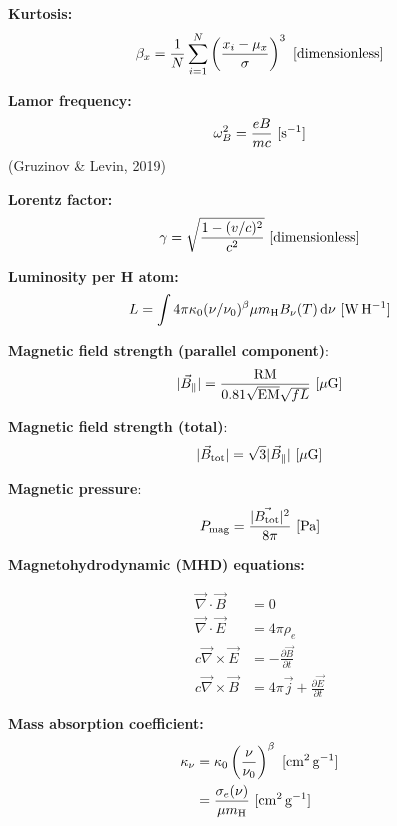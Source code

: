 \documentclass[a4paper,10pt]{article}
\begin{document}
{\noindent}\textbf{Kurtosis:}
\begin{align*}
    \beta_x = \frac{1}{N} \sum_{i=1}^N \left(\frac{x_i-\mu_x}{\sigma}\right)^3 ~ [{\rm dimensionless}]
\end{align*}

{\noindent}\textbf{Lamor frequency:}
\begin{align*}
	\omega_B^2 = \frac{eB}{mc} ~ [{\rm s^{-1}}]
\end{align*}
(Gruzinov \& Levin, 2019)

{\noindent}\textbf{Lorentz factor:}
\begin{align*}
    \gamma = \sqrt{\frac{1 - (v/c)^2}{c^2}} ~ [{\rm dimensionless}]
\end{align*}

{\noindent}\textbf{Luminosity per H atom:}
\begin{align*}
    L = \int 4\pi\kappa_0(\nu/\nu_0)^\beta \mu m_{\rm H}B_\nu(T) \,{\rm d}\nu ~ [{\rm W\,H^{-1}}]
\end{align*}

{\noindent}\textbf{Magnetic field strength (parallel component)}:
\begin{align*}
    \lvert\vec{B}_\parallel\rvert = \frac{\rm RM}{0.81\sqrt{\rm EM}\sqrt{fL}} ~[{\rm \mu G]}
\end{align*}

{\noindent}\textbf{Magnetic field strength (total)}:
\begin{align*}
    \lvert\vec{B}_{\rm tot}\rvert = \sqrt{3}\lvert\vec{B}_\parallel\rvert ~[{\rm \mu G]}
\end{align*}

{\noindent}\textbf{Magnetic pressure}:
\begin{align*}
    P_{\rm mag} = \frac{\lvert\vec{B_{\rm tot}}\rvert^2}{8\pi}~ [{\rm Pa]}
\end{align*}

{\noindent}\textbf{Magnetohydrodynamic (MHD) equations:}

\begin{align*}
    \vec\nabla\cdot\vec{B} &= 0 \\
    \vec\nabla\cdot\vec{E} &= 4\pi\rho_e \\
    c\vec\nabla\times\vec{E} &= - \frac{\partial\vec{B}}{\partial t} \\
    c\vec\nabla\times\vec{B} &= 4\pi\vec{j} + \frac{\partial\vec{E}}{\partial t}
\end{align*}

{\noindent}\textbf{Mass absorption coefficient:}
\begin{align*}
    \kappa_\nu &= \kappa_0 \left(\frac{\nu}{\nu_0}\right)^\beta ~ [{\rm cm^2\,g^{-1}}] \\
                       &= \frac{\sigma_e(\nu)}{\mu m_{\rm H}} ~ [{\rm cm^2\,g^{-1}}]
\end{align*}
\end{document}
